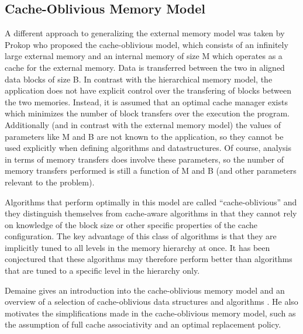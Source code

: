 \documentclass{acm_proc_article-sp}
\begin{document}
\subsection{Cache-Oblivious Memory Model}
A different approach to generalizing the external memory model was taken by Prokop \cite{prokop1999coa} who proposed the cache-oblivious model, which consists of an infinitely large external memory and an internal memory of size M which operates as a cache for the external memory. Data is transferred between the two in aligned data blocks of size B. In contrast with the hierarchical memory model, the application does not have explicit control over the transfering of blocks between the two memories. Instead, it is assumed that an optimal cache manager exists which minimizes the number of block transfers over the execution the program. Additionally (and in contrast with the external memory model) the values of parameters like M and B are not known to the application, so they cannot be used explicitly when defining algorithms and datastructures. Of course, analysis in terms of memory transfers does involve these parameters, so the number of memory transfers performed is still a function of M and B (and other parameters relevant to the problem).

Algorithms that perform optimally in this model are called ``cache-oblivious'' and they distinguish themselves from cache-aware algorithms in that they cannot rely on knowledge of the block size or other specific properties of the cache configuration. The key advantage of this class of algorithms is that they are implicitly tuned to all levels in the memory hierarchy at once. It has been conjectured that these algorithms may therefore perform better than algorithms that are tuned to a specific level in the hierarchy only.

Demaine gives an introduction into the cache-oblivious memory model and an overview of a selection of cache-oblivious data structures and algorithms \cite{demaine2002coa}. He also motivates the simplifications made in the cache-oblivious memory model, such as the assumption of full cache associativity and an optimal replacement policy.

\end{document}
